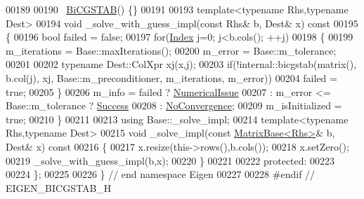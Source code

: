 \begin{DoxyCode}
00189 
00190   ~\hyperlink{group___iterative_linear_solvers___module_class_eigen_1_1_bi_c_g_s_t_a_b}{BiCGSTAB}() \{\}
00191 
00193   \textcolor{keyword}{template}<\textcolor{keyword}{typename} Rhs,\textcolor{keyword}{typename} Dest>
00194   \textcolor{keywordtype}{void} \_solve\_with\_guess\_impl(\textcolor{keyword}{const} Rhs& b, Dest& x)\textcolor{keyword}{ const}
00195 \textcolor{keyword}{  }\{    
00196     \textcolor{keywordtype}{bool} failed = \textcolor{keyword}{false};
00197     \textcolor{keywordflow}{for}(\hyperlink{namespace_eigen_a62e77e0933482dafde8fe197d9a2cfde}{Index} j=0; j<b.cols(); ++j)
00198     \{
00199       m\_iterations = Base::maxIterations();
00200       m\_error = Base::m\_tolerance;
00201       
00202       \textcolor{keyword}{typename} Dest::ColXpr xj(x,j);
00203       \textcolor{keywordflow}{if}(!internal::bicgstab(matrix(), b.col(j), xj, Base::m\_preconditioner, m\_iterations, m\_error))
00204         failed = \textcolor{keyword}{true};
00205     \}
00206     m\_info = failed ? \hyperlink{group__enums_gga85fad7b87587764e5cf6b513a9e0ee5eaaf9b736d310a664e7729d163a035cc5f}{NumericalIssue}
00207            : m\_error <= Base::m\_tolerance ? \hyperlink{group__enums_gga85fad7b87587764e5cf6b513a9e0ee5ea52581b035f4b59c203b8ff999ef5fcea}{Success}
00208            : \hyperlink{group__enums_gga85fad7b87587764e5cf6b513a9e0ee5eaba1c8763d1179778070f365ecc4157a8}{NoConvergence};
00209     m\_isInitialized = \textcolor{keyword}{true};
00210   \}
00211 
00213   \textcolor{keyword}{using} Base::\_solve\_impl;
00214   \textcolor{keyword}{template}<\textcolor{keyword}{typename} Rhs,\textcolor{keyword}{typename} Dest>
00215   \textcolor{keywordtype}{void} \_solve\_impl(\textcolor{keyword}{const} \hyperlink{group___core___module_class_eigen_1_1_matrix_base}{MatrixBase<Rhs>}& b, Dest& x)\textcolor{keyword}{ const}
00216 \textcolor{keyword}{  }\{
00217     x.resize(this->rows(),b.cols());
00218     x.setZero();
00219     \_solve\_with\_guess\_impl(b,x);
00220   \}
00221 
00222 \textcolor{keyword}{protected}:
00223 
00224 \};
00225 
00226 \} \textcolor{comment}{// end namespace Eigen}
00227 
00228 \textcolor{preprocessor}{#endif // EIGEN\_BICGSTAB\_H}
\end{DoxyCode}
